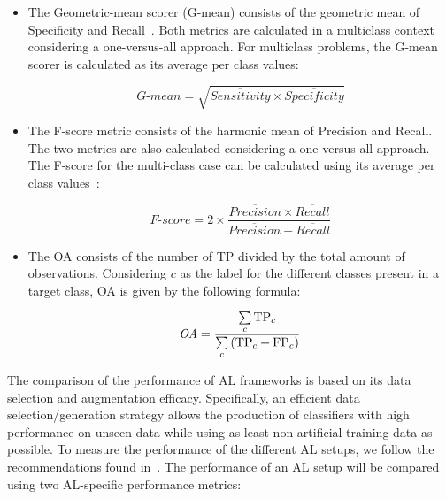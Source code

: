 \documentclass[parskip=full]{scrartcl}
\begin{document}
\begin{itemize}
    \item The Geometric-mean scorer (G-mean) consists of the geometric mean of
        Specificity and Recall~\cite{Kubat1997}. Both metrics are calculated
        in a multiclass context considering a one-versus-all approach. For
        multiclass problems, the G-mean scorer is calculated as its average
        per class values: 
        
        \begin{equation*}
            \textit{G-mean} = \sqrt{\overline{Sensitivity} \times
            \overline{Specificity}}
        \end{equation*}

    \item The F-score metric consists of the harmonic mean of Precision and
        Recall. The two metrics are also calculated considering a
        one-versus-all approach. The F-score for the multi-class case
        can be calculated using its average per class values~\cite{Jeni2013}:

        \begin{equation*}
            \textit{F-score}=2\times\frac{\overline{Precision} \times
            \overline{Recall}}{\overline{Precision} + \overline{Recall}}
        \end{equation*}

    \item The OA consists of the number of TP divided by the total amount of
        observations. Considering $c$ as the label for the different classes
        present in a target class, OA is given by the following formula:

        \begin{equation*}
            \textit{OA} = \frac{\sum\limits_{c}{\text{TP}_{c}}}{%
		    	      \sum\limits_{c}{(\text{TP}_{c}+\text{FP}_{c})}}
        \end{equation*}
\end{itemize}

The comparison of the performance of AL frameworks is based on its data
selection and augmentation efficacy. Specifically, an efficient data
selection/generation strategy allows the production of classifiers with high
performance on unseen data while using as least non-artificial training data
as possible. To measure the performance of the different AL setups, we follow
the recommendations found in~\cite{Kottke2017}. The performance of an AL setup
will be compared using two AL-specific performance metrics:
\end{document}
